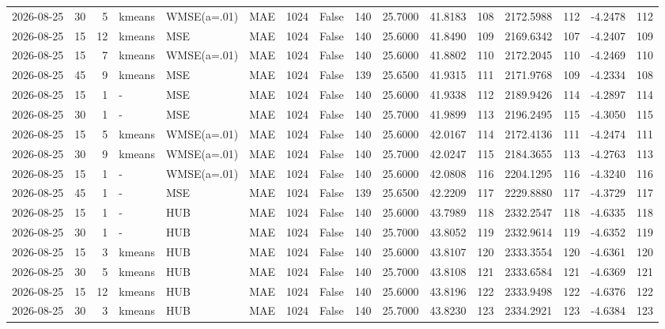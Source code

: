 \documentclass[10pt]{article}
\begin{document}
\begin{landscape}
\begin{longtable}{@{}lrrlllrcrrrrrrrr@{}}
2026-08-25 & 30 & 5 & kmeans & WMSE(a=.01) & MAE & 1024 & False & 140 & 25.7000 & 41.8183 & 108 & 2172.5988 & 112 & -4.2478 & 112 \\
2026-08-25 & 15 & 12 & kmeans & MSE & MAE & 1024 & False & 140 & 25.6000 & 41.8490 & 109 & 2169.6342 & 107 & -4.2407 & 109 \\
2026-08-25 & 15 & 7 & kmeans & WMSE(a=.01) & MAE & 1024 & False & 140 & 25.6000 & 41.8802 & 110 & 2172.2045 & 110 & -4.2469 & 110 \\
2026-08-25 & 45 & 9 & kmeans & MSE & MAE & 1024 & False & 139 & 25.6500 & 41.9315 & 111 & 2171.9768 & 109 & -4.2334 & 108 \\
2026-08-25 & 15 & 1 & - & MSE & MAE & 1024 & False & 140 & 25.6000 & 41.9338 & 112 & 2189.9426 & 114 & -4.2897 & 114 \\
2026-08-25 & 30 & 1 & - & MSE & MAE & 1024 & False & 140 & 25.7000 & 41.9899 & 113 & 2196.2495 & 115 & -4.3050 & 115 \\
2026-08-25 & 15 & 5 & kmeans & WMSE(a=.01) & MAE & 1024 & False & 140 & 25.6000 & 42.0167 & 114 & 2172.4136 & 111 & -4.2474 & 111 \\
2026-08-25 & 30 & 9 & kmeans & WMSE(a=.01) & MAE & 1024 & False & 140 & 25.7000 & 42.0247 & 115 & 2184.3655 & 113 & -4.2763 & 113 \\
2026-08-25 & 15 & 1 & - & WMSE(a=.01) & MAE & 1024 & False & 140 & 25.6000 & 42.0808 & 116 & 2204.1295 & 116 & -4.3240 & 116 \\
2026-08-25 & 45 & 1 & - & MSE & MAE & 1024 & False & 139 & 25.6500 & 42.2209 & 117 & 2229.8880 & 117 & -4.3729 & 117 \\
2026-08-25 & 15 & 1 & - & HUB & MAE & 1024 & False & 140 & 25.6000 & 43.7989 & 118 & 2332.2547 & 118 & -4.6335 & 118 \\
2026-08-25 & 30 & 1 & - & HUB & MAE & 1024 & False & 140 & 25.7000 & 43.8052 & 119 & 2332.9614 & 119 & -4.6352 & 119 \\
2026-08-25 & 15 & 3 & kmeans & HUB & MAE & 1024 & False & 140 & 25.6000 & 43.8107 & 120 & 2333.3554 & 120 & -4.6361 & 120 \\
2026-08-25 & 30 & 5 & kmeans & HUB & MAE & 1024 & False & 140 & 25.7000 & 43.8108 & 121 & 2333.6584 & 121 & -4.6369 & 121 \\
2026-08-25 & 15 & 12 & kmeans & HUB & MAE & 1024 & False & 140 & 25.6000 & 43.8196 & 122 & 2333.9498 & 122 & -4.6376 & 122 \\
2026-08-25 & 30 & 3 & kmeans & HUB & MAE & 1024 & False & 140 & 25.7000 & 43.8230 & 123 & 2334.2921 & 123 & -4.6384 & 123 \\

\end{longtable}
\end{landscape}
\end{document}
